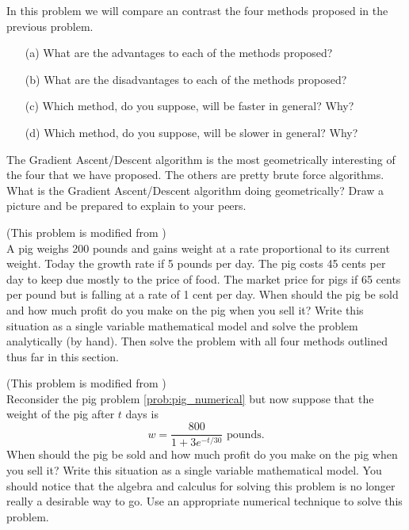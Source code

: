 \begin{problem}
    In this problem we will compare an contrast the four methods proposed in the previous
    problem.
    \begin{enumerate}
        \item[(a)] What are the advantages to each of the methods proposed?
        \item[(b)] What are the disadvantages to each of the methods proposed?
        \item[(c)] Which method, do you suppose, will be faster in general?  Why?
        \item[(d)] Which method, do you suppose, will be slower in general?  Why?
    \end{enumerate}
\end{problem}

\begin{problem}
    The Gradient Ascent/Descent algorithm is the most geometrically interesting of the
    four that we have proposed.  The others are pretty brute force algorithms.  What is
    the Gradient Ascent/Descent algorithm doing geometrically?  Draw a picture and be
    prepared to explain to your peers.
\end{problem}


\begin{problem}\label{prob:pig_numerical}
    (This problem is modified from \cite{Meerschaert}) \\
    A pig weighs 200 pounds and gains weight at a rate proportional to its current weight.
    Today the growth rate if 5 pounds per day.  The pig costs 45 cents per day to keep due
    mostly to the price of food.  The market price for pigs if 65 cents per pound but is
    falling at a rate of 1 cent per day.  When should the pig be sold and how much profit
    do you make on the pig when you sell it?  Write this situation as a single variable
    mathematical model and solve the problem analytically (by hand).  Then solve the
    problem with all four methods outlined thus far in this section.
\end{problem}

\begin{problem}
    (This problem is modified from \cite{Meerschaert}) \\
    Reconsider the pig problem \ref{prob:pig_numerical} but now suppose that the weight of
    the pig after $t$ days is 
    \[ w = \frac{800}{1+3e^{-t/30}} \text{ pounds}. \]
    When should the pig be sold and how much profit do you make on the pig when you sell
    it?  Write this situation as a single variable mathematical model.  You should notice
    that the algebra and calculus for solving this problem is no longer really a desirable
    way to go.  Use an appropriate numerical technique to solve this problem.
\end{problem}

